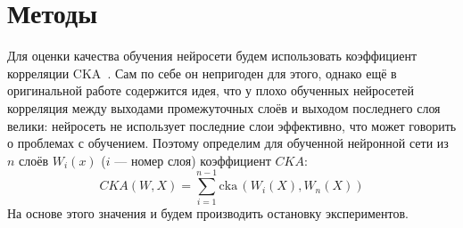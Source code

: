 \section{Методы}
Для оценки качества обучения нейросети будем использовать коэффициент корреляции CKA~\cite{kornblith2019similarity}.
Сам по себе он непригоден для этого, однако ещё в оригинальной работе содержится идея, что у плохо обученных нейросетей
корреляция между выходами промежуточных слоёв и выходом последнего слоя велики: нейросеть не использует последние слои эффективно, что может говорить
о проблемах с обучением.
Поэтому определим для обученной нейронной сети из $n$ слоёв $W_i(x)$ ($i$ --- номер слоя) коэффициент $\textit{CKA}$:
\begin{equation}
    CKA(W, X) = \sum_{i = 1}^{n - 1} \mathrm{cka}\,(W_i(X), W_n(X))
\end{equation}
На основе этого значения и будем производить остановку экспериментов.